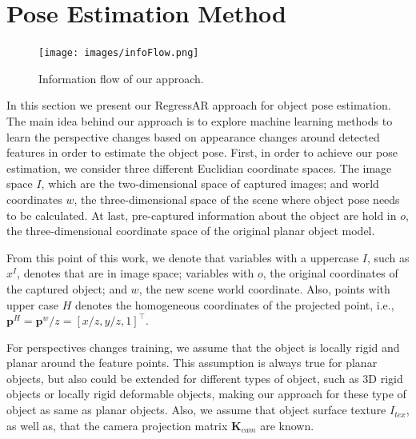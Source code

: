 \documentclass[annual]{acmsiggraph}
\begin{document}
\section{Pose Estimation Method}
\label{sec:poseMethod}

\begin{figure}[t]
\texttt{[image: images/infoFlow.png]}
\caption{Information flow of our approach.}
\label{img:inforFlow}
\end{figure}
	
	

In this section we present our RegressAR approach for object pose estimation. The main idea behind our approach is to explore machine learning methods to learn the perspective changes based on appearance changes around detected features in order to estimate the object pose. First, in order to achieve our pose estimation, we consider three different Euclidian coordinate spaces. The image space $I$, which are the two-dimensional space of captured images; and world coordinates $w$, the three-dimensional space of the scene where object pose needs to be calculated. At last, pre-captured  information about the object are hold in $o$, the three-dimensional coordinate space of the original planar object model. 

From this point of this work, we denote that variables with a uppercase $I$, such as $x^I$, denotes that are in image space; variables with $o$, the original coordinates of the captured object; and $w$, the new scene world coordinate. Also, points with upper case $H$ denotes the homogeneous coordinates of the projected point, i.e., $\mathbf{p}^H = \mathbf{p}^w/z = [x/z, y/z, 1]^\top$. 

For perspectives changes training, we assume that the object is locally rigid and planar around the feature points. This assumption is always true for planar objects, but also could be extended for different types of object, such as 3D rigid objects \cite{Lepetit:2005} or locally rigid deformable objects, making our approach for these type of object as same as planar objects. Also, we assume that object surface texture $I_{tex}$, as well as, that the camera projection matrix $\mathbf{K}_{cam}$ are known. 
\end{document}
